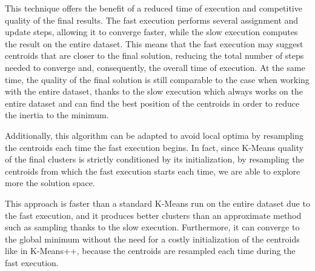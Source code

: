 This technique offers the benefit of a reduced time of execution and competitive quality of the final results.
The fast execution performs several assignment and update steps, allowing it to converge faster, while the slow execution computes the result on the entire dataset. This means that the fast execution may suggest centroids that are closer to the final solution, reducing the total number of steps needed to converge and, consequently, the overall time of execution. 
At the same time, the quality of the final solution is still comparable to the case when working with the entire dataset, thanks to the slow execution which always works on the entire dataset and can find the best position of the centroids in order to reduce the inertia to the minimum.

Additionally, this algorithm can be adapted to avoid local optima by resampling the centroids each time the fast execution begins. In fact, since K-Means quality of the final clusters is strictly conditioned by its initialization, by resampling the centroids from which the fast execution starts each time, we are able to explore more the solution space.

This approach is faster than a standard K-Means run on the entire dataset due to the fast execution, and it produces better clusters than an approximate method such as sampling thanks to the slow execution. Furthermore, it can converge to the global minimum without the need for a costly initialization of the centroids like in K-Means++, because the centroids are resampled each time during the fast execution.

